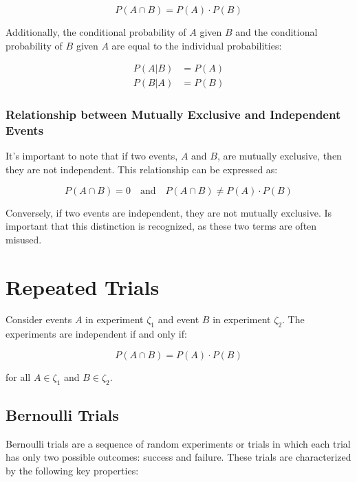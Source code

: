 \documentclass[12pt]{book}
\theoremstyle{definition}
\begin{document}
\[
P(A \cap B) = P(A) \cdot P(B)
\]

Additionally, the conditional probability of \(A\) given \(B\) and the conditional probability of \(B\) given \(A\) are equal to the individual probabilities:

\[
\begin{aligned}
    P(A | B) & = P(A) \\
    P(B | A) & = P(B)
\end{aligned}
\]




\subsubsection{Relationship between Mutually Exclusive and Independent Events}

It's important to note that if two events, \(A\) and \(B\), are mutually exclusive, then they are not independent. This relationship can be expressed as:

\[
P(A \cap B) = 0 \quad \text{and} \quad P(A \cap B) \neq P(A) \cdot P(B)
\]

Conversely, if two events are independent, they are not mutually exclusive. Is important that this distinction is recognized, as these two terms are often misused.



\section{Repeated Trials}
Consider events \(A\) in experiment \(\zeta_1\) and event \(B\) in experiment \(\zeta_2\). The experiments are independent if and only if:

\[
P(A \cap B) = P(A) \cdot P(B)
\]

for all \(A \in \zeta_1\) and \(B \in \zeta_2\).

\subsection{Bernoulli Trials}
Bernoulli trials are a sequence of random experiments or trials in which each trial has only two possible outcomes: success and failure. These trials are characterized by the following key properties:
\end{document}
